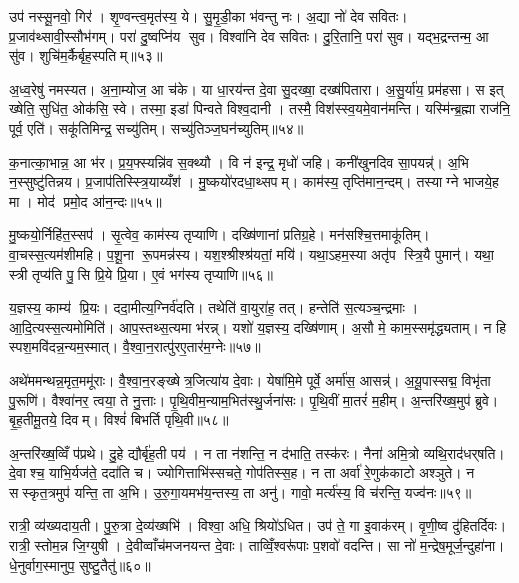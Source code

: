 उप॑ नस्सू॒नवो॒ गिर॑। शृ॒ण्वन्त्व॒मृत॑स्य॒ ये। सु॒मृ॒डी॒का भ॑वन्तु नः। अ॒द्या नो॑ देव सवितः। प्र॒जाव॑थ्सावी॒स्सौभ॑गम्। परा॑ दु॒ष्वप्नि॑य सुव। विश्वा॑नि देव सवितः। दु॒रि॒तानि॒ परा॑ सुव। यद्भ॒द्रन्तन्म॒ आ सु॑व। शुचि॑म॒र्कैर्बृह॒स्पतिम्॥५३॥

अ॒ध्व॒रेषु॑ नमस्यत। अ॒ना॒म्योज॒ आ च॑के। या धा॒रय॑न्त दे॒वा सु॒दख्षा॒ दख्ष॑पितारा। अ॒सु॒र्या॑य॒ प्रम॑हसा। स इत् ख्षेति॒ सुधि॑त॒ ओक॑सि॒ स्वे। तस्मा॒ इडा॑ पिन्वते विश्व॒दानी। तस्मै॒ विश॑स्स्व॒यमे॒वान॑मन्ति। यस्मि॑न्ब्र॒ह्मा राज॑नि॒ पूर्व॒ एति॑। सकू॑तिमिन्द्र॒ सच्यु॑तिम्। सच्यु॑तिञ्ज॒घन॑च्युतिम्॥५४॥

क॒नात्का॒भान्न॒ आ भ॑र। प्र॒य॒फ्स्यन्नि॑व स॒क्थ्यौ। वि न॑ इन्द्र॒ मृधो॑ जहि। कनी॑खुनदिव सा॒पयन्न्॑। अ॒भि न॒स्सुष्टु॑तिन्नय। प्र॒जाप॑तिस्स्त्रि॒याय्यँश॑। मु॒ष्कयो॑रदधा॒थ्सपम्। काम॑स्य॒ तृप्ति॑मान॒न्दम्। तस्याग्ने भाजये॒ह मा। मोद॑ प्रमो॒द आ॑न॒न्दः॥५५॥

मु॒ष्कयो॒र्निहि॑त॒स्सप॑। सृ॒त्वेव॒ काम॑स्य तृप्याणि। दख्षि॑णानां प्रतिग्र॒हे। मन॑सश्चि॒त्तमाकू॑तिम्। वा॒चस्स॒त्यम॑शीमहि। प॒शू॒ना रू॒पमन्न॑स्य। यश॒श्श्रीश्श्र॑यतां॒ मयि॑। यथा॒ऽहम॒स्या अतृ॑प स्त्रि॒यै पुमान्॑। यथा॒ स्त्री तृप्य॑ति पु॒सि प्रि॒ये प्रि॒या। ए॒वं भग॑स्य तृप्याणि॥५६॥

य॒ज्ञस्य॒ काम्य॑ प्रि॒यः। ददा॒मीत्य॒ग्निर्व॑दति। तथेति॑ वा॒युरा॑ह॒ तत्। हन्तेति॑ स॒त्यञ्च॒न्द्रमाः। आ॒दि॒त्यस्स॒त्यमोमिति॑। आप॒स्तथ्स॒त्यमा भ॑रन्न्। यशो॑ य॒ज्ञस्य॒ दख्षि॑णाम्। अ॒सौ मे॒ काम॒स्समृ॑द्ध्यताम्। न हि स्पश॒मवि॑दन्न॒न्यम॒स्मात्। वै॒श्वा॒न॒रात्पु॑रए॒तार॑म॒ग्नेः॥५७॥

अथे॑ममन्थन्न॒मृत॒ममू॑राः। वै॒श्वा॒न॒रङ्ख्षेत्र॒जित्या॑य दे॒वाः। येषा॑मि॒मे पूर्वे॒ अर्मा॑स॒ आसन्न्॑। अ॒यू॒पास्सद्म॒ विभृ॑ता पु॒रूणि॑। वैश्वा॑नर॒ त्वया॒ ते नु॒त्ताः। पृ॒थि॒वीम॒न्याम॒भित॑स्थु॒र्जना॑सः। पृ॒थि॒वीं मा॒तरं॑ म॒हीम्। अ॒न्तरि॑ख्ष॒मुप॑ ब्रुवे। बृ॒ह॒तीमू॒तये॒ दिवम्। विश्वं॑ बिभर्ति पृथि॒वी॥५८॥

अ॒न्तरि॑ख्ष॒व्विँ प॑प्रथे। दु॒हे द्यौर्बृ॑ह॒ती पय॑। न ता न॑शन्ति॒ न द॑भाति॒ तस्क॑रः। नैना॑ अमि॒त्रो व्यथि॒राद॑धर्‌षति। दे॒वाश्च॒ याभि॒र्यज॑ते॒ ददा॑ति च। ज्योगित्ताभि॑स्सचते॒ गोप॑तिस्स॒ह। न ता अर्वा॑ रे॒णुक॑काटो अश्ञुते। न सस्कृत॒त्रमुप॑ यन्ति॒ ता अ॒भि। उ॒रु॒गा॒यमभ॑य॒न्तस्य॒ ता अनु॑। गावो॒ मर्त्य॑स्य॒ वि च॑रन्ति॒ यज्व॑नः॥५९॥

रात्री॒ व्य॑ख्यदाय॒ती। पु॒रु॒त्रा दे॒व्य॑ख्षभि॑। विश्वा॒ अधि॒ श्रियो॑ऽधित। उप॑ ते॒ गा इ॒वाक॑रम्। वृ॒णी॒ष्व दु॑हितर्दिवः। रात्री॒ स्तोम॒न्न जि॒ग्युषी। दे॒वीव्वाँच॑मजनयन्त दे॒वाः। ताव्विँ॒श्वरू॑पाः प॒शवो॑ वदन्ति। सा नो॑ म॒न्द्रेष॒मूर्ज॒न्दुहा॑ना। धे॒नुर्वाग॒स्मानुप॒ सुष्टु॒तैतु॑॥६०॥

